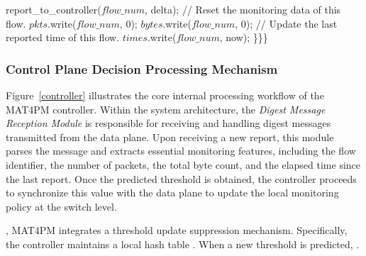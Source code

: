 \begin{algorithm}[!t]
\begin{algorithmic}[1]
        \STATE \hspace{3em} report\_to\_controller($flow\_num$, delta);
        \STATE \hspace{3em} // Reset the monitoring data of this flow.
        \STATE \hspace{3em} $pkts$.write($flow\_num$, 0);
        \STATE \hspace{3em} $bytes$.write($flow\_num$, 0);
        \STATE \hspace{3em} // Update the last reported time of this flow.
        \STATE \hspace{3em} $times$.write($flow\_num$, now);
        \STATE \}\}\}
    \end{algorithmic}
\end{algorithm}

\subsubsection{Control Plane Decision Processing Mechanism}

Figure~\ref{controller} illustrates the core internal processing workflow of the MAT4PM controller. 
Within the system architecture, the \textit{Digest Message Reception Module} is responsible for receiving and handling digest messages transmitted from the data plane. 
Upon receiving a new report, this module parses the message and extracts essential monitoring features, including the flow identifier, the number of packets, the total byte count, and the elapsed time since the last report. 
Once the predicted threshold is obtained, the controller proceeds to synchronize this value with the data plane to update the local monitoring policy at the switch level.

, MAT4PM integrates a threshold update suppression mechanism. 
Specifically, the controller maintains a local hash table . 
When a new threshold is predicted, . 

